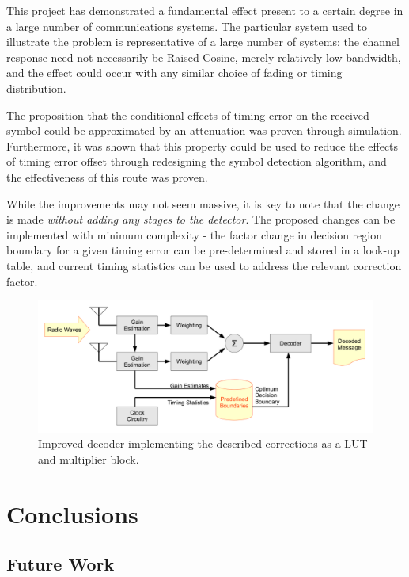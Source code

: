 This project has demonstrated a fundamental effect present to a certain degree in a large number of communications systems. The particular system used to illustrate the problem is representative of a large number of systems; the channel response need not necessarily be Raised-Cosine, merely relatively low-bandwidth, and the effect could occur with any similar choice of fading or timing distribution.

The proposition that the conditional effects of timing error on the received symbol could be approximated by an attenuation was proven through simulation. Furthermore, it was shown that this property could be used to reduce the effects of timing error offset through redesigning the symbol detection algorithm, and the effectiveness of this route was proven.

While the improvements may not seem massive, it is key to note that the change is made \emph{without adding any stages to the detector}. The proposed changes can be implemented with minimum complexity - the factor change in decision region boundary for a given timing error can be pre-determined and stored in a look-up table,  and current timing statistics can be used to address the relevant correction factor.

\begin{figure}[htbp]
\centering
\includegraphics[width=\linewidth]{system.png}
\caption[Improved decoder implementation]{Improved decoder implementing the described corrections as a LUT and multiplier block.}
\end{figure}

\part{Conclusions}

\chapter{Future Work}


